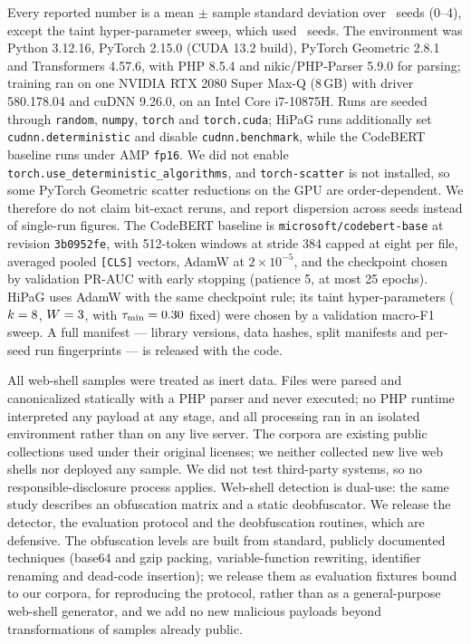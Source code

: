 \documentclass[pdflatex,sn-mathphys-num]{sn-jnl}
\begin{document}
Every reported number is a mean $\pm$ sample standard deviation over
\RqOneSeeds\ seeds (0--4), except the taint hyper-parameter sweep, which used
\RqFiveSeeds\ seeds. The environment was Python 3.12.16, PyTorch 2.15.0 (CUDA
13.2 build), PyTorch Geometric 2.8.1 and Transformers 4.57.6, with PHP 8.5.4
and nikic/PHP-Parser 5.9.0 for parsing; training ran on one NVIDIA RTX 2080
Super Max-Q (8\,GB) with driver 580.178.04 and cuDNN 9.26.0, on an Intel Core
i7-10875H. Runs are seeded through \texttt{random}, \texttt{numpy},
\texttt{torch} and \texttt{torch.cuda}; HiPaG runs additionally set
\texttt{cudnn.deterministic} and disable \texttt{cudnn.benchmark}, while the
CodeBERT baseline runs under AMP \texttt{fp16}. We did not enable
\texttt{torch.use\_deterministic\_algorithms}, and \texttt{torch-scatter} is
not installed, so some PyTorch Geometric scatter reductions on the GPU are
order-dependent. We therefore do not claim bit-exact reruns, and report
dispersion across seeds instead of single-run figures. The CodeBERT baseline
is \texttt{microsoft/codebert-base} at revision \texttt{3b0952fe}, with
512-token windows at stride 384 capped at eight per file, averaged pooled
\texttt{[CLS]} vectors, AdamW at $2\times10^{-5}$, and the checkpoint chosen by
validation PR-AUC with early stopping (patience 5, at most 25 epochs). HiPaG
uses AdamW with the same checkpoint rule; its taint hyper-parameters
($k=8$, $W=3$, with
$\tau_{\min}=0.30$ fixed) were chosen by a validation macro-F1
sweep. A full manifest --- library versions, data hashes, split manifests and
per-seed run fingerprints --- is released with the code.

All web-shell samples were treated as inert data. Files were parsed and
canonicalized statically with a PHP parser and never executed; no PHP runtime
interpreted any payload at any stage, and all processing ran in an isolated
environment rather than on any live server. The corpora are existing public
collections used under their original licenses; we neither collected new live
web shells nor deployed any sample. We did not test third-party systems, so no
responsible-disclosure process applies. Web-shell detection is dual-use: the
same study describes an obfuscation matrix and a static deobfuscator. We
release the detector, the evaluation protocol and the deobfuscation routines,
which are defensive. The obfuscation levels are built from standard, publicly
documented techniques (base64 and gzip packing, variable-function rewriting,
identifier renaming and dead-code insertion); we release them as evaluation
fixtures bound to our corpora, for reproducing the protocol, rather than as a
general-purpose web-shell generator, and we add no new malicious payloads
beyond transformations of samples already public.
\end{document}

